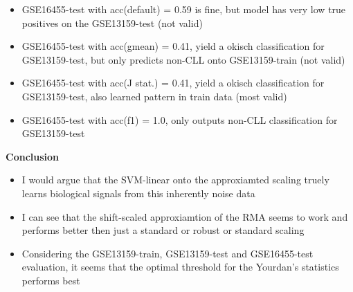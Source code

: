 \documentclass{article}
\begin{document}
		\begin{itemize}
			\item GSE16455-test with acc(default) = 0.59 is fine, but model has very low true positives on the GSE13159-test (not valid)
			\item GSE16455-test with acc(gmean) = 0.41, yield a okisch classification for GSE13159-test, but only predicts non-CLL onto GSE13159-train (not valid)
			\item GSE16455-test with acc(J stat.) = 0.41, yield a okisch classification for GSE13159-test, also learned pattern in train data (most valid)
			\item GSE16455-test with acc(f1) = 1.0, only outputs  non-CLL classification for GSE13159-test
		\end{itemize}
		
		\textbf{Conclusion}
		\begin{itemize}
			\item I would argue that the SVM-linear onto the approxiamted scaling truely learns biological signals from this inherently noise data 
			\item I can see that the shift-scaled approxiamtion of the RMA seems to work and performs better then just a standard or robust or standard scaling 
			\item Considering the GSE13159-train, GSE13159-test and GSE16455-test evaluation, it seems that the optimal threshold for the Yourdan's statistics performs best  
		\end{itemize}
		
		
		\newpage
		
\end{document}
